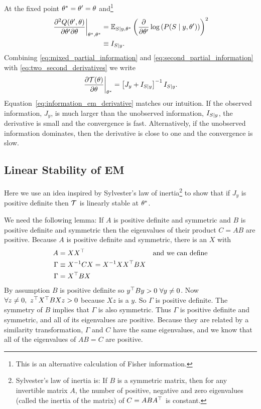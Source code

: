 At the fixed point ${\theta^*} = \theta' = \theta$
and\footnote{This is an alternative calculation of Fisher information.}
\begin{align}
  \left. \frac{\partial^2 Q(\theta',  \theta)}{\partial \theta'
  \partial \theta} \right|_{{\theta^*}, {\theta^*}}
  &= \mathbb{E}_{S \mid y, {\theta^*}} \left( \frac{\partial}{\partial
    \theta'} \log \left( P(S \mid y, \theta' )\right) \right)^2\\
  \label{eq:mixed_partial_information}
  &\equiv I_{S \mid y}.
\end{align}
Combining \eqref{eq:mixed_partial_information} and
\eqref{eq:second_partial_information} with
\eqref{eq:two_second_derivatives} we write
\begin{equation}
  \label{eq:information_em_derivative}
  \left.\frac{\partial \EMmap(\theta)}{\partial \theta}
  \right|_{\EMfixedPoint} = \left[J_y + I_{S \given y}  \right]^{-1}
  I_{S \given y}.
\end{equation}
Equation~\eqref{eq:information_em_derivative} matches our intuition.
If the observed information, $J_y$, is much larger than the unobserved
information, $I_{S \mid y}$, the derivative is small and the
convergence is fast.  Alternatively, if the unobserved information
dominates, then the derivative is close to one and the convergence is
slow.

\subsection*{Linear Stability of EM}
\label{em_stabiltiy}

Here we use an idea inspired by Sylvester's law of
inertia\footnote{Sylvester's law of inertia is: If $B$ is a symmetric
  matrix, then for any invertible matrix $A$, the number of positive,
  negative and zero eigenvalues (called the inertia of the matrix) of
  $C = A B A^\top$ is constant.} to show that if $J_y$ is positive definite
then $\EMmap$ is linearly stable at ${\theta^*}$.

We need the following lemma: If $A$ is positive definite and symmetric
and $B$ is positive definite and symmetric then the eigenvalues of
their product $C = AB$ are positive.  Because $A$ is positive
definite and symmetric, there is an $X$ with
\begin{align*}
  A &= X X^\top  &&\text{and we can define}\\
  \Gamma &\equiv X^{-1} C X = X^{-1} X X^\top B X \\
  \Gamma &= X^\top B X \\
\end{align*}
By assumption $B$ is positive definite so
$y^\top B y > 0 ~ \forall y \neq 0$.  Now
$\forall z \neq 0, ~ z^\top X^\top B X z > 0$ because $Xz$ is
a $y$.  So $\Gamma$ is positive definite.  The symmetry of $B$ implies
that $\Gamma$ is also symmetric.  Thus $\Gamma$ is positive definite
and symmetric, and all of its eigenvalues are positive.  Because they are related by a
similarity transformation, $\Gamma$ and $C$ have the same eigenvalues,
and we know that all of the eigenvalues of $AB = C$ are positive.

